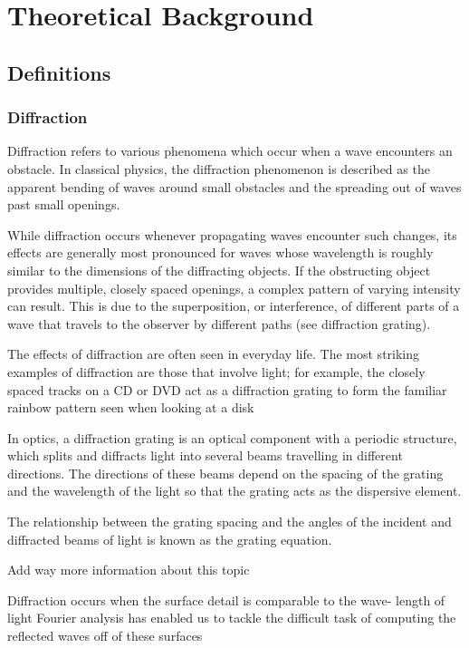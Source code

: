 \section{Theoretical Background}
\subsection{Definitions}


\subsubsection{Diffraction}

Diffraction refers to various phenomena which occur when a wave encounters an obstacle. In classical physics, the diffraction phenomenon is described as the apparent bending of waves around small obstacles and the spreading out of waves past small openings.

While diffraction occurs whenever propagating waves encounter such changes, its effects are generally most pronounced for waves whose wavelength is roughly similar to the dimensions of the diffracting objects. If the obstructing object provides multiple, closely spaced openings, a complex pattern of varying intensity can result. This is due to the superposition, or interference, of different parts of a wave that travels to the observer by different paths (see diffraction grating).

The effects of diffraction are often seen in everyday life. The most striking examples of diffraction are those that involve light; for example, the closely spaced tracks on a CD or DVD act as a diffraction grating to form the familiar rainbow pattern seen when looking at a disk

In optics, a diffraction grating is an optical component with a periodic structure, which splits and diffracts light into several beams travelling in different directions. The directions of these beams depend on the spacing of the grating and the wavelength of the light so that the grating acts as the dispersive element.

The relationship between the grating spacing and the angles of the incident and diffracted beams of light is known as the grating equation.


Add way more information about this topic

Diffraction occurs when the surface detail is comparable to the wave- length of light
Fourier analysis has enabled us to tackle the difficult task of computing the reflected waves off of these surfaces


